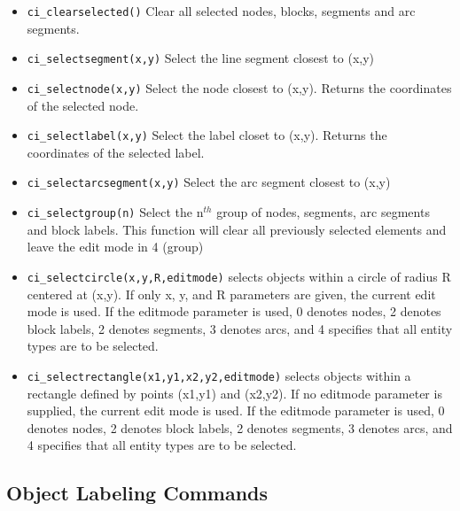 \begin{itemize}
\item {\tt ci\_clearselected()} Clear all selected nodes, blocks, segments and arc
segments.

\item {\tt ci\_selectsegment(x,y)} Select the line segment closest to (x,y)

\item {\tt ci\_selectnode(x,y)} Select the node closest to (x,y).
Returns the coordinates of the selected node.

\item {\tt ci\_selectlabel(x,y)} Select the label closet to (x,y).
Returns the coordinates of the selected label.

\item {\tt ci\_selectarcsegment(x,y)} Select the arc segment closest to (x,y)

\item {\tt ci\_selectgroup(n)} Select the n$^{th}$ group of nodes, segments, arc
segments and block labels. This function will clear all previously selected
elements and leave the edit mode in 4 (group)

\item{\tt ci\_selectcircle(x,y,R,editmode)} selects objects within a circle of radius
R centered at (x,y).  If only x, y, and R parameters are given, the current
edit mode is used.  If the editmode parameter is used, 0 denotes nodes, 2
denotes block labels, 2 denotes segments, 3 denotes arcs, and 4 specifies
that all entity types are to be selected.

\item{\tt ci\_selectrectangle(x1,y1,x2,y2,editmode)} selects objects within a rectangle
defined by points (x1,y1) and (x2,y2). If no editmode parameter is supplied,
the current edit mode is used.  If the editmode parameter is used, 0 denotes
nodes, 2 denotes block labels, 2 denotes segments, 3 denotes arcs, and 4 
specifies that all entity types are to be selected.

\end{itemize}


\subsection{Object Labeling Commands}

